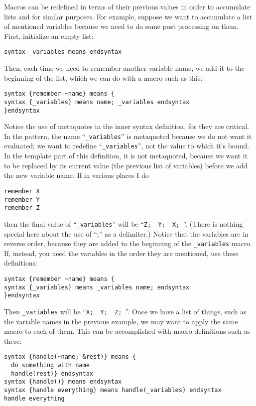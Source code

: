 \documentclass[12pt]{article}
\begin{document}
Macros can be redefined in terms of their previous values in order to accumulate lists and for similar purposes.
For example, suppose we want to accumulate a list of mentioned variables because we need to do some post processing on them.
First, initialize an empty list:
\begin{lstlisting}[frame=single]
syntax _variables means endsyntax
\end{lstlisting}
Then, each time we need to remember another variable name, we add it to the beginning of the list, which we can do with a macro such as this:
\begin{lstlisting}[frame=single]
syntax {remember ~name} means {
syntax {_variables} means name; _variables endsyntax
}endsyntax
\end{lstlisting}
Notice the use of metaquotes in the inner syntax definition, for they are critical.
In the pattern, the name ``\lstinline"_variables"'' is metaquoted because we do not want it evaluated; we want to redefine ``\lstinline"_variables"'', not the value to which it's bound.
In the template part of this definition, it is not metaquoted, because we want it to be replaced by its current value (the previous list of variables) before we add the new variable name.
If in various places I do 
\begin{lstlisting}[frame=single]
remember X
remember Y
remember Z
\end{lstlisting}
then the final value of ``\lstinline"_variables"'' will be ``\lstinline"Z;  Y;  X; "''.
(There is nothing special here about the use of ``;'' as a delimiter.)
Notice that the variables are in reverse order, because they are added to the beginning of the \lstinline"_variables" macro.
If, instead, you need the variables in the order they are mentioned, use these definitions:
\begin{lstlisting}[frame=single]
syntax {remember ~name} means {
syntax {_variables} means _variables name; endsyntax
}endsyntax
\end{lstlisting}
Then \lstinline"_variables" will be ``\lstinline"X;  Y;  Z; "''.
Once we have a list of things, such as the variable names in the previous example, we may want to apply the same macro to each of them.
This can be accomplished with macro definitions such as these:
\begin{lstlisting}[frame=single]
syntax {handle(~name; &rest)} means { 
  do something with name
  handle(rest)} endsyntax
syntax {handle()} means endsyntax
syntax {handle everything} means handle(_variables) endsyntax
handle everything
\end{lstlisting}
\end{document}
